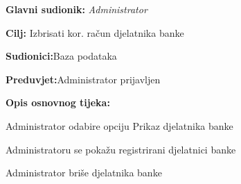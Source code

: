 \eject 
\noindent {}
\begin{packed_item}
	
	\item \textbf{Glavni sudionik: }\textit{Administrator}
	\item  \textbf{Cilj:} {Izbrisati kor. račun djelatnika banke}
	\item  \textbf{Sudionici:}{Baza podataka}
	\item  \textbf{Preduvjet:}{Administrator prijavljen}
	\item  \textbf{Opis osnovnog tijeka:}
	
	\item[] \begin{packed_enum}
		
		\item {Administrator odabire opciju Prikaz djelatnika banke}
		\item {Administratoru se pokažu registrirani djelatnici banke}
		\item {Administrator briše djelatnika banke}
		
	\end{packed_enum}
	
\end{packed_item}

